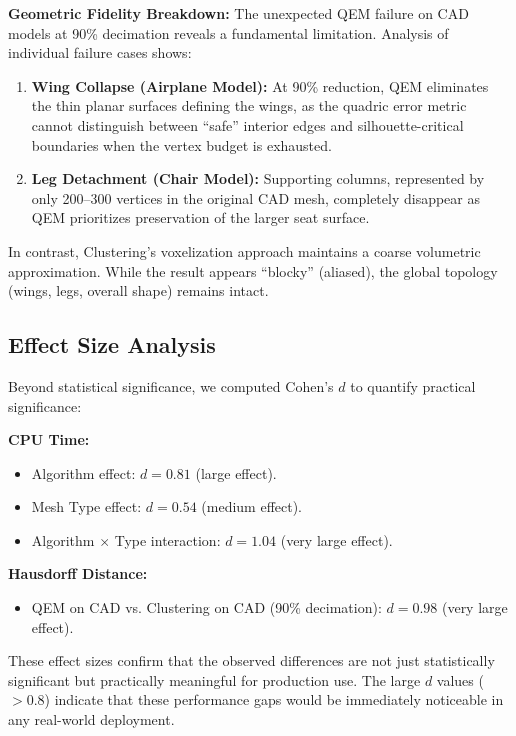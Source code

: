 \textbf{Geometric Fidelity Breakdown:}
The unexpected QEM failure on CAD models at 90\% decimation reveals a fundamental limitation. Analysis of individual failure cases shows:
\begin{enumerate}
    \item \textbf{Wing Collapse (Airplane Model):} At 90\% reduction, QEM eliminates the thin planar surfaces defining the wings, as the quadric error metric cannot distinguish between ``safe'' interior edges and silhouette-critical boundaries when the vertex budget is exhausted.
    \item \textbf{Leg Detachment (Chair Model):} Supporting columns, represented by only 200--300 vertices in the original CAD mesh, completely disappear as QEM prioritizes preservation of the larger seat surface.
\end{enumerate}
In contrast, Clustering's voxelization approach maintains a coarse volumetric approximation. While the result appears ``blocky'' (aliased), the global topology (wings, legs, overall shape) remains intact.

\subsection{Effect Size Analysis}

Beyond statistical significance, we computed Cohen's $d$ to quantify practical significance:

\textbf{CPU Time:}
\begin{itemize}
    \item Algorithm effect: $d = 0.81$ (large effect).
    \item Mesh Type effect: $d = 0.54$ (medium effect).
    \item Algorithm $\times$ Type interaction: $d = 1.04$ (very large effect).
\end{itemize}

\textbf{Hausdorff Distance:}
\begin{itemize}
    \item QEM on CAD vs. Clustering on CAD (90\% decimation): $d = 0.98$ (very large effect).
\end{itemize}
These effect sizes confirm that the observed differences are not just statistically significant but practically meaningful for production use. The large $d$ values ($> 0.8$) indicate that these performance gaps would be immediately noticeable in any real-world deployment.
